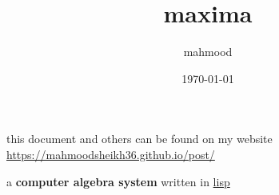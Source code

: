 \documentclass[a4paper,12pt]{article}
\author{mahmood}
\date{\today}
\title{maxima}
\begin{document}
\maketitle
\begin{note}
this document and others can be found on my website\\
\url{https://mahmoodsheikh36.github.io/post/}
\end{note}
a \textbf{computer algebra system} written in \href{20230215220838-lisp.org}{lisp}
\end{document}
